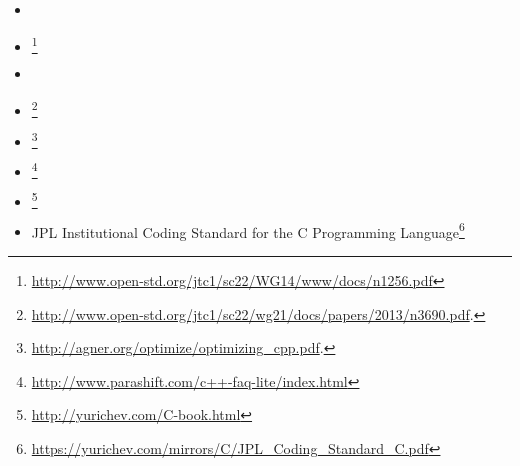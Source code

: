 \label{CCppBooks}

\begin{itemize}

\item \KRBook

\item \CNineNineStd\footnote{\AlsoAvailableAs \url{http://www.open-std.org/jtc1/sc22/WG14/www/docs/n1256.pdf}}

\item \TCPPPL

\item \CppOneOneStd\footnote{\AlsoAvailableAs \url{http://www.open-std.org/jtc1/sc22/wg21/docs/papers/2013/n3690.pdf}.}

\item \AgnerFogCPP\footnote{\AlsoAvailableAs \url{http://agner.org/optimize/optimizing_cpp.pdf}.}

\item \ParashiftCPPFAQ\footnote{\AlsoAvailableAs \url{http://www.parashift.com/c++-faq-lite/index.html}}

\item \CNotes\footnote{\AlsoAvailableAs \url{http://yurichev.com/C-book.html}}

\item JPL Institutional Coding Standard for the C Programming Language\footnote{\AlsoAvailableAs \url{https://yurichev.com/mirrors/C/JPL_Coding_Standard_C.pdf}}


\end{itemize}

